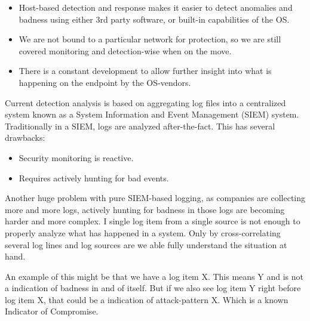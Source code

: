 \begin{itemize}
    \item Host-based detection and response makes it easier to detect anomalies and badness using either 3rd party software, or built-in capabilities of the OS.
    \item We are not bound to a particular network for protection, so we are still covered monitoring and detection-wise when on the move.
    \item There is a constant development to allow further insight into what is happening on the endpoint by the OS-vendors.
\end{itemize}

Current detection analysis is based on aggregating log files into a centralized system known as a System Information and Event Management (SIEM) system. Traditionally in a SIEM, logs are analyzed after-the-fact. This has several drawbacks:

\begin{itemize}
    \item Security monitoring is reactive.
    \item Requires actively hunting for bad events.
\end{itemize}

Another huge problem with pure SIEM-based logging, as companies are collecting more and more logs, actively hunting for badness in those logs are becoming harder and more complex. I single log item from a single source is not enough to properly analyze what has happened in a system. Only by cross-correlating several log lines and log sources are we able fully understand the situation at hand.

An example of this might be that we have a log item X. This means Y and is not a indication of badness in and of itself.
But if we also see log item Y right before log item X, that could be a indication of attack-pattern X. Which is a known Indicator of Compromise.



\iffalse
FROM http://folk.uio.no/josang/papers/MJ2018-ICCSP.pdf
Current threat detection analysis approaches include aggregation of log files in a centralized system known as security information and event management (SIEM) which performs inspections
and flags anomalies. A SIEM system collects logs by deploying
multiple collection agents to gather security-related events from
end-user devices, servers, intrusion detection systems (IDS), intrusion prevention systems (IPS) and firewalls, network devices such as
routers and DNS servers and more. In particular, one resource that
has received considerable attention for endpoint visibility has been
Sysmon; a Windows system service and device driver that monitors
and logs system activity of Windows workstations. Approaches for
threat detection using Sysmon have been proposed mainly focusing
on search engines (NoSQL database systems) or graph databases.
\fi

